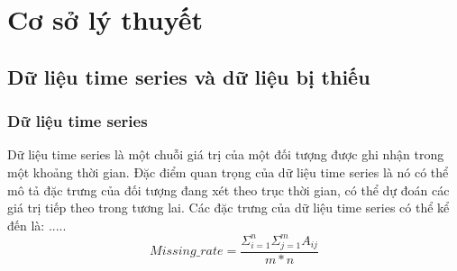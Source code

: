\chapter{Cơ sở lý thuyết}
\section{Dữ liệu time series và dữ liệu bị thiếu}
\subsection{Dữ liệu time series}
Dữ liệu time series là một chuỗi giá trị của một đối tượng được ghi nhận trong một khoảng thời gian. Đặc điểm quan trọng của dữ liệu time series là nó có thể mô tả đặc trưng của đối tượng đang xét theo trục thời gian, có thể dự đoán các giá trị tiếp theo trong tương lai. Các đặc trưng của dữ liệu time series có thể kể đến là:
.....
\begin{equation}
    Missing\_rate = \frac{\Sigma^n_{i=1} \Sigma^m_{j=1}{A_{ij}}}{m * n}
\end{equation}
    